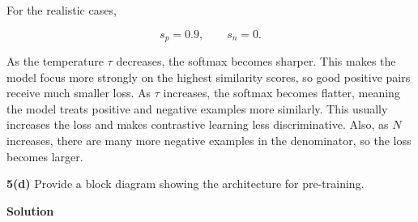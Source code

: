 \documentclass[10pt]{article}
\begin{document}
For the realistic cases,

\[
s_p = 0.9, \qquad s_n = 0.
\]

As the temperature $\tau$ decreases, the softmax becomes sharper. This makes the model focus more strongly on the highest similarity scores, so good positive pairs receive much smaller loss. As $\tau$ increases, the softmax becomes flatter, meaning the model treats positive and negative examples more similarly. This usually increases the loss and makes contrastive learning less discriminative. Also, as $N$ increases, there are many more negative examples in the denominator, so the loss becomes larger.

\newpage

\textbf{5(d)} Provide a block diagram showing the architecture for pre-training.

\textbf{Solution}
\end{document}
